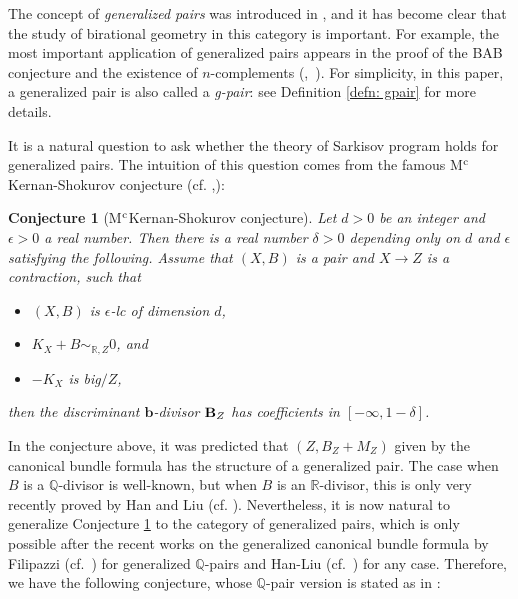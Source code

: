 \documentclass[11pt]{amsart}
\numberwithin{equation}{section}
\newcommand{\bb}{\bm{b}}
\newcommand{\Qq}{\mathbb{Q}}
\newcommand{\Rr}{\mathbb{R}}
\newtheorem{conj}[thm]{Conjecture}
\theoremstyle{definition}
\theoremstyle{remark}
\theoremstyle{definition}
\begin{document}
The concept of \emph{generalized pairs} was introduced in \cite{BZ16}, and it has become clear that the study of birational geometry in this category is important. For example, the most important application of generalized pairs appears in the proof of the BAB conjecture and the existence of $n$-complements (\cite{Bir16},~\cite{Bir19}). For simplicity, in this paper, a generalized pair is also called a \emph{g-pair}: see Definition \ref{defn: gpair} for more details.

It is a natural question to ask whether the theory of Sarkisov program holds for generalized pairs. The intuition of this question comes from the famous M$\textsuperscript{c}$Kernan-Shokurov conjecture (cf. \cite[Conjecture 1.2]{Bir16},\cite[Conjecture 1.7]{Bir18}):

\begin{conj}[M$\textsuperscript{c}$Kernan-Shokurov conjecture]\label{conj: ms conjecture}
Let $d>0$ be an integer and $\epsilon>0$ a real number. Then there is a real number $\delta>0$ depending only on $d$ and $\epsilon$ satisfying the following. Assume that $(X,B)$ is a pair and $X\rightarrow Z$ is a contraction, such that 
\begin{itemize}
    \item $(X,B)$ is $\epsilon$-lc of dimension $d$,
    \item $K_X+B\sim_{\Rr,Z}0$, and
    \item $-K_X$ is big$/Z$,
\end{itemize}
then the discriminant $\bb$-divisor $\textbf{\rm\textbf{B}}_Z$ has coefficients in $[-\infty,1-\delta]$.
\end{conj}

In the conjecture above, it was predicted that $(Z,B_Z+M_Z)$ given by the canonical bundle formula has the structure of a generalized pair. The case when $B$ is a $\Qq$-divisor is well-known, but when $B$ is an $\Rr$-divisor, this is only very recently proved by Han and Liu (cf. \cite[Corollary 1.2]{HL19}). Nevertheless, it is now natural to generalize Conjecture \ref{conj: ms conjecture} to the category of generalized pairs, which is only possible after the recent works on the generalized canonical bundle formula by Filipazzi (cf.~\cite[Theroem 1.4]{Fil18}) for generalized $\Qq$-pairs and Han-Liu (cf.~\cite[Corollary 1.2]{HL19}) for any case. Therefore, we have the following conjecture, whose $\Qq$-pair version is stated as in \cite[Conjecture 2.4]{Bir18}:
\end{document}
